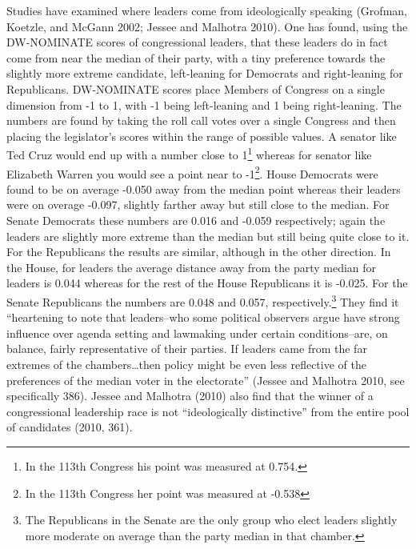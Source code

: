 \documentclass[12pt,twoside]{reedthesis}
\begin{document}
  Studies have examined where leaders come from ideologically speaking
  (Grofman, Koetzle, and McGann 2002; Jessee and Malhotra 2010). One has
  found, using the DW-NOMINATE scores of congressional leaders, that these
  leaders do in fact come from near the median of their party, with a tiny
  preference towards the slightly more extreme candidate, left-leaning for
  Democrats and right-leaning for Republicans. DW-NOMINATE scores place
  Members of Congress on a single dimension from -1 to 1, with -1 being
  left-leaning and 1 being right-leaning. The numbers are found by taking
  the roll call votes over a single Congress and then placing the
  legislator's scores within the range of possible values. A senator like
  Ted Cruz would end up with a number close to 1\footnote{In the 113th
    Congress his point was measured at 0.754.} whereas for senator like
  Elizabeth Warren you would see a point near to -1\footnote{In the 113th
    Congress her point was measured at -0.538}. House Democrats were found
  to be on average -0.050 away from the median point whereas their leaders
  were on overage -0.097, slightly farther away but still close to the
  median. For Senate Democrats these numbers are 0.016 and -0.059
  respectively; again the leaders are slightly more extreme than the
  median but still being quite close to it. For the Republicans the
  results are similar, although in the other direction. In the House, for
  leaders the average distance away from the party median for leaders is
  0.044 whereas for the rest of the House Republicans it is -0.025. For
  the Senate Republicans the numbers are 0.048 and 0.057,
  respectively.\footnote{The Republicans in the Senate are the only group
    who elect leaders slightly more moderate on average than the party
    median in that chamber.} They find it ``heartening to note that
  leaders--who some political observers argue have strong influence over
  agenda setting and lawmaking under certain conditions--are, on balance,
  fairly representative of their parties. If leaders came from the far
  extremes of the chambers\ldots{}then policy might be even less
  reflective of the preferences of the median voter in the electorate''
  (Jessee and Malhotra 2010, see specifically 386). Jessee and Malhotra
  (2010) also find that the winner of a congressional leadership race is
  not ``ideologically distinctive'' from the entire pool of candidates
  (2010, 361).
  
\end{document}
